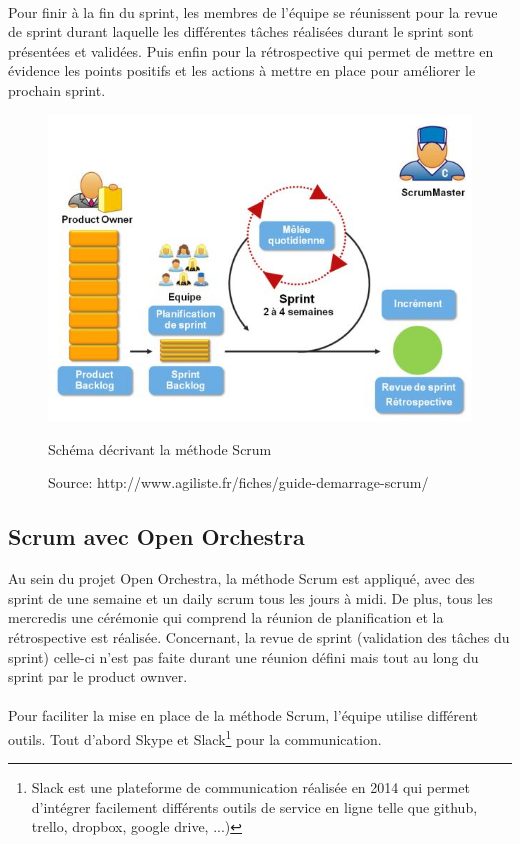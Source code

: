  \paragraph{}
Pour finir à la fin du sprint, les membres de l'équipe se réunissent pour la revue de sprint durant laquelle les différentes tâches réalisées durant le sprint sont présentées et validées. Puis enfin pour la rétrospective qui permet de mettre en évidence les points positifs et les actions à mettre en place pour améliorer le prochain sprint.

\begin{figure}[H]
  \begin{center}
    \includegraphics[scale=0.75]{images/scrum}
  \end{center}
  \caption{Schéma décrivant la méthode Scrum}
  \caption*{Source: http://www.agiliste.fr/fiches/guide-demarrage-scrum/}
  \label{scrum}
\end{figure}

\subsection{Scrum avec Open Orchestra}
Au sein du projet Open Orchestra, la méthode Scrum est appliqué, avec des sprint de une semaine et un daily scrum tous les jours à midi.
De plus, tous les mercredis une \og cérémonie \fg{} qui comprend la réunion de planification et la rétrospective est réalisée.
Concernant, la revue de sprint (validation des tâches du sprint) celle-ci n'est pas faite durant une réunion défini mais tout au long du sprint par le product ownver.
 \paragraph{}
 Pour faciliter la mise en place de la méthode Scrum, l'équipe utilise différent outils.
 Tout d'abord Skype et Slack\footnote{Slack est une plateforme de communication réalisée en 2014 qui permet d'intégrer facilement différents outils de service en ligne telle que github, trello, dropbox, google drive, ...)} pour la communication.
